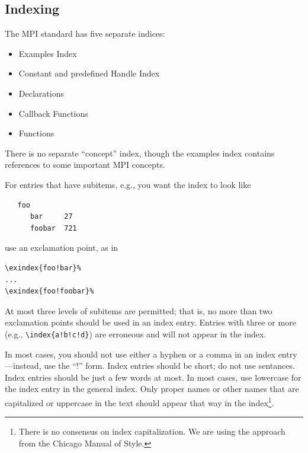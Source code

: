 \documentclass[letterpaper,twoside,11pt,fleqn]{article}
\def\MPI/{\textsf{MPI}}    %
\begin{document}
\subsection{Indexing}
The \MPI/ standard has five separate indices:
\begin{itemize}
\item Examples Index
\item Constant and predefined Handle Index
\item Declarations
\item Callback Functions
\item Functions
\end{itemize}
There is no separate ``concept'' index, though the examples index
contains references to some important \MPI/ concepts.

For entries that have subitems, e.g., you want the index to look like

\begin{verbatim}
   foo
      bar     27
      foobar  721
\end{verbatim}

\noindent use an exclamation point, as in

\begin{verbatim}
\exindex{foo!bar}%
...
\exindex{foo!foobar}%
\end{verbatim}
At most three levels of subitems are permitted; that is, no more than two
exclamation points should be used in an index entry.
Entries with three or more (e.g., \verb+\index{a!b!c!d}+) are
erroneous and will not appear in the index.

In most cases, you should not use either a hyphen or a comma in an
index entry---instead, use the ``!'' form.
Index entries should be short; do not use sentances. Index entries
should be just a few words at most.
In most cases, use lowercase for the index entry in the general index.
Only proper names or
other names that are capitalized or uppercase in the text should appear
that way in the index\footnote{There is no consensus on index
  capitalization. We are using the approach from the Chicago Manual of
Style.}.
\end{document}
